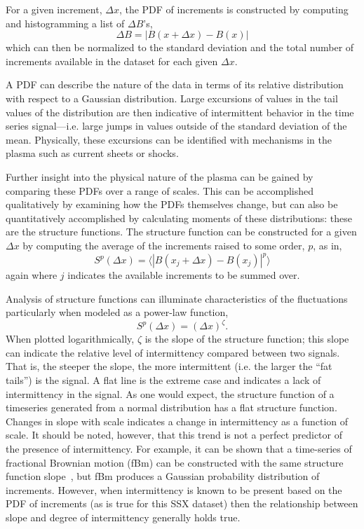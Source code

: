 \documentclass[preprint2]{aastex}
\begin{document}
For a given increment, $\Delta x$, the PDF of increments is constructed by computing and histogramming a list of $\Delta B$'s,
\begin{equation}
\Delta B = |B(x+\Delta x)-B(x)|
\label{eq:increment}
\end{equation}
which can then be normalized to the standard deviation and the total number of increments available in the dataset for each given $\Delta x$.

A  PDF can describe the nature of the data in terms of its relative distribution with respect to a Gaussian distribution. Large excursions of values in the tail values of the distribution are then indicative of intermittent behavior in the time series signal---i.e. large jumps in values outside of the standard deviation of the mean. Physically, these excursions can be identified with mechanisms in the plasma such as current sheets or shocks.

Further insight into the physical nature of the plasma can be gained by comparing these PDFs over a range of scales. This can be accomplished qualitatively by examining how the PDFs themselves change, but can also be quantitatively accomplished by calculating moments of these distributions: these are the structure functions. The structure function can be constructed for a given $\Delta x$ by computing the average of the increments raised to some order, $p$, as in,
\begin{equation}
S^{p}(\Delta x) = \langle|B(x_{j}+\Delta x)-B(x_{j})|^{p}\rangle
\label{eq:structfunc}
\end{equation}
again where $j$ indicates the available increments to be summed over. 

Analysis of structure functions can illuminate characteristics of the fluctuations particularly when modeled as a power-law function,
\begin{equation}
S^{p}(\Delta x) = (\Delta x)^{\zeta}.
\label{eq:power-law}
\end{equation}
When plotted logarithmically, $\zeta$ is the slope of the structure function; this slope can indicate the relative level of intermittency compared between two signals. That is, the steeper the slope, the more intermittent (i.e. the larger the ``fat tails'') is the signal. A flat line is the extreme case and indicates a lack of intermittency in the signal. As one would expect, the structure function of a timeseries generated from a normal distribution has a flat structure function. Changes in slope with scale indicates a change in intermittency as a function of scale. It should be noted, however, that this trend is not a perfect predictor of the presence of intermittency. For example, it can be shown that a time-series of fractional Brownian motion (fBm) can be constructed with the same structure function slope~\citep{hnat2003}, but fBm produces a Gaussian probability distribution of increments. However, when intermittency is known to be present based on the PDF of increments (as is true for this SSX dataset) then the relationship between slope and degree of intermittency generally holds true.
\end{document}
